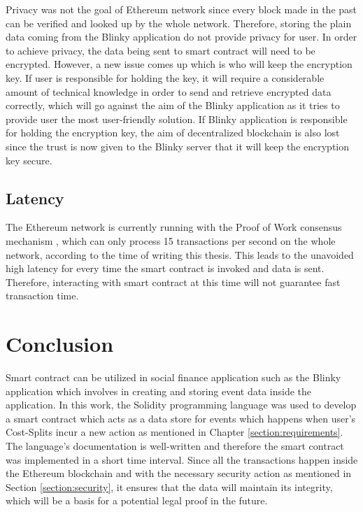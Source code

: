 \documentclass[twoside,draftfooter]{tutthesis} %
\begin{document}
Privacy was not the goal of Ethereum network since every block made in the past can be verified and looked up by the whole network. Therefore, storing the plain data coming from the Blinky application do not provide privacy for user. In order to achieve privacy, the data being sent to smart contract will need to be encrypted. However, a new issue comes up which is who will keep the encryption key. If user is responsible for holding the key, it will require a considerable amount of technical knowledge in order to send and retrieve encrypted data correctly, which will go against the aim of the Blinky application as it tries to provide user the most user-friendly solution. If Blinky application is responsible for holding the encryption key, the aim of decentralized blockchain is also lost since the trust is now given to the Blinky server that it will keep the encryption key secure.

\section{Latency}

The Ethereum network is currently running with the Proof of Work consensus mechanism \citep{RefWorks:doc:BitcoinWhitepaper}, which can only process 15 transactions per second on the whole network, according to the time of writing this thesis. This leads to the unavoided high latency for every time the smart contract is invoked and data is sent. Therefore, interacting with smart contract at this time will not guarantee fast transaction time.

\chapter{Conclusion}
\label{ch:conclusion}

Smart contract can be utilized in social finance application such as the Blinky application which involves in creating and storing event data inside the application. In this work, the Solidity programming language was used to develop a smart contract which acts as a data store for events which happens when user's Cost-Splits incur a new action as mentioned in Chapter \ref{section:requirements}. The language's documentation is well-written and therefore the smart contract was implemented in a short time interval. Since all the transactions happen inside the Ethereum blockchain and with the necessary security action as mentioned in Section \ref{section:security}, it ensures that the data will maintain its integrity, which will be a basis for a potential legal proof in the future.
\end{document}
